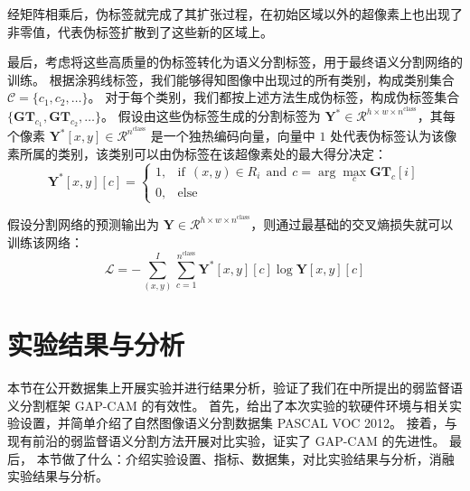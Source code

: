 经矩阵相乘后，伪标签就完成了其扩张过程，在初始区域以外的超像素上也出现了非零值，代表伪标签扩散到了这些新的区域上。
\par
最后，考虑将这些高质量的伪标签转化为语义分割标签，用于最终语义分割网络的训练。
根据涂鸦线标签，我们能够得知图像中出现过的所有类别，构成类别集合 $\mathcal{C} = \{ c_1, c_2, \dots \}$。
对于每个类别，我们都按上述方法生成伪标签，构成伪标签集合 $\{ \mathbf{GT}_{c_1}, \mathbf{GT}_{c_2}, \dots \}$。
假设由这些伪标签生成的分割标签为 $\mathbf{Y}^{*} \in \mathcal{R}^{h \times w \times n^\text{class}}$，其每个像素 $\mathbf{Y}^{*}[x,y] \in \mathcal{R}^{n^\text{class}}$ 是一个独热编码向量，向量中 $1$ 处代表伪标签认为该像素所属的类别，该类别可以由伪标签在该超像素处的最大得分决定：
\begin{equation}
\mathbf{Y}^{*}[x,y][c] =
\begin{cases}
1,&\text{if}\ \ (x,y) \in R_i\ \ \text{and}\ \ c = \arg\max\limits_c \mathbf{GT}_{c}[i]\\
0,&\text{else}
\end{cases}
\end{equation}
\par
假设分割网络的预测输出为 $\mathbf{Y} \in \mathcal{R}^{h \times w \times n^\text{class}}$，则通过最基础的交叉熵损失就可以训练该网络：
\begin{equation}
\mathcal{L} = - \sum\limits_{(x,y)}^{I} \sum\limits_{c=1}^{n^\text{class}} \mathbf{Y}^{*}[x,y][c] \log{\mathbf{Y}[x,y][c]}
\label{eqn:crossentropy}
\end{equation}
\section{实验结果与分析}
本节在公开数据集上开展实验并进行结果分析，验证了我们在中所提出的弱监督语义分割框架 GAP-CAM 的有效性。
首先，给出了本次实验的软硬件环境与相关实验设置，并简单介绍了自然图像语义分割数据集 PASCAL VOC 2012。
接着，与现有前沿的弱监督语义分割方法开展对比实验，证实了 GAP-CAM 的先进性。
最后，
本节做了什么：介绍实验设置、指标、数据集，对比实验结果与分析，消融实验结果与分析。
\par

